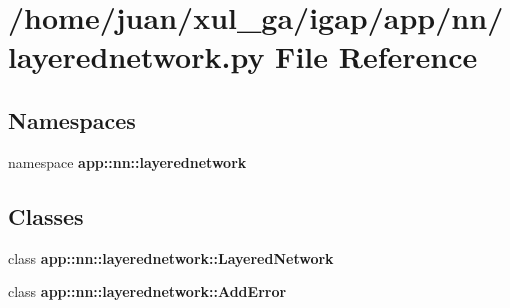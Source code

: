 \section{/home/juan/xul\_\-ga/igap/app/nn/layerednetwork.py File Reference}
\label{layerednetwork_8py}
\subsection*{Namespaces}
\begin{CompactItemize}
\item 
namespace {\bf app::nn::layerednetwork}
\end{CompactItemize}
\subsection*{Classes}
\begin{CompactItemize}
\item 
class {\bf app::nn::layerednetwork::LayeredNetwork}
\item 
class {\bf app::nn::layerednetwork::AddError}
\end{CompactItemize}
